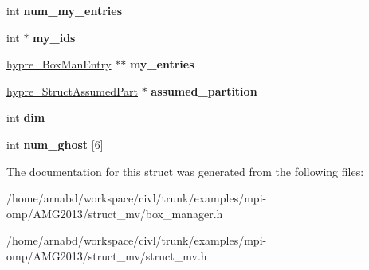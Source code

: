 \begin{DoxyCompactItemize}
\item 
\hypertarget{structhypre__BoxManager_a865f1c5c81bd441cf7bc17abdefa9a48}{}int {\bfseries num\+\_\+my\+\_\+entries}\label{structhypre__BoxManager_a865f1c5c81bd441cf7bc17abdefa9a48}

\item 
\hypertarget{structhypre__BoxManager_a663e388fbe4658414a66c8a5a8148540}{}int $\ast$ {\bfseries my\+\_\+ids}\label{structhypre__BoxManager_a663e388fbe4658414a66c8a5a8148540}

\item 
\hypertarget{structhypre__BoxManager_adbf2fd5fa16babe49f2b04663c934eb5}{}\hyperlink{structhypre__BoxManEntry__struct}{hypre\+\_\+\+Box\+Man\+Entry} $\ast$$\ast$ {\bfseries my\+\_\+entries}\label{structhypre__BoxManager_adbf2fd5fa16babe49f2b04663c934eb5}

\item 
\hypertarget{structhypre__BoxManager_a70b39c73f251e2d1feb1987976bc35fe}{}\hyperlink{structhypre__StructAssumedPart}{hypre\+\_\+\+Struct\+Assumed\+Part} $\ast$ {\bfseries assumed\+\_\+partition}\label{structhypre__BoxManager_a70b39c73f251e2d1feb1987976bc35fe}

\item 
\hypertarget{structhypre__BoxManager_a493b09c13471251f5bd7e5c33bf8a95e}{}int {\bfseries dim}\label{structhypre__BoxManager_a493b09c13471251f5bd7e5c33bf8a95e}

\item 
\hypertarget{structhypre__BoxManager_a79eb01c6ce074e938c5ef1347d963748}{}int {\bfseries num\+\_\+ghost} \mbox{[}6\mbox{]}\label{structhypre__BoxManager_a79eb01c6ce074e938c5ef1347d963748}

\end{DoxyCompactItemize}


The documentation for this struct was generated from the following files\+:\begin{DoxyCompactItemize}
\item 
/home/arnabd/workspace/civl/trunk/examples/mpi-\/omp/\+A\+M\+G2013/struct\+\_\+mv/box\+\_\+manager.\+h\item 
/home/arnabd/workspace/civl/trunk/examples/mpi-\/omp/\+A\+M\+G2013/struct\+\_\+mv/struct\+\_\+mv.\+h\end{DoxyCompactItemize}
